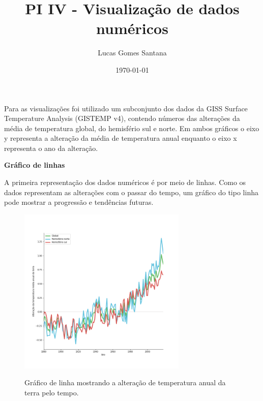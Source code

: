 \documentclass[12pt]{article}
\title{PI IV - Visualização de dados numéricos}
\author{Lucas Gomes Santana}
\date{\today}
\begin{document}
\maketitle

Para as visualizações foi utilizado um subconjunto dos dados da GISS Surface Temperature Analysis (GISTEMP v4)\cite{gistemp}, contendo números das alterações da média de temperatura global, do hemisfério sul e norte. Em ambos gráficos o eixo y representa a alteração da média de temperatura anual enquanto o eixo x representa o ano da alteração. \par

\textbf{\Large Gráfico de linhas}\par
A primeira representação dos dados numéricos é por meio de linhas.  Como os dados representam as alterações com o passar do tempo, um gráfico do tipo linha pode mostrar a progressão e tendências futuras.
\setcounter{figure}{0}
\begin{figure}[H]
\centering
\includegraphics[width = 0.714\textwidth]{lines.png}
\label{fig:A.1}
\caption{Gráfico de linha mostrando a alteração de temperatura anual da terra pelo tempo.}
\end{figure}
\end{document}
